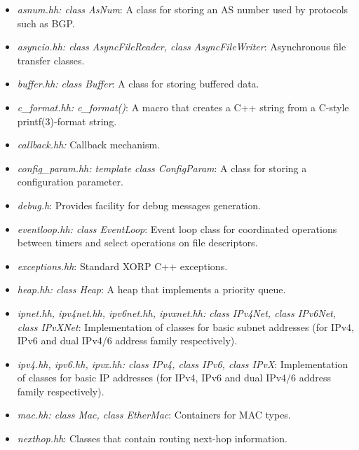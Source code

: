\documentclass[11pt]{article}
\begin{document}
\begin{itemize}

  \item \emph{asnum.hh: class AsNum}: A class for storing an AS number
  used by protocols such as BGP.

  \item \emph{asyncio.hh: class AsyncFileReader, class AsyncFileWriter}:
  Asynchronous file transfer classes.

  \item \emph{buffer.hh: class Buffer}:  A class for storing buffered
  data.

  \item \emph{c\_format.hh: c\_format()}: A macro that creates a C++ string
  from a C-style printf(3)-format string.

  \item \emph{callback.hh:} Callback mechanism.

  \item \emph{config\_param.hh: template class ConfigParam}: A class for
  storing a configuration parameter.

  \item \emph{debug.h}: Provides facility for debug messages generation.

  \item \emph{eventloop.hh: class EventLoop}: Event loop class for
  coordinated operations between timers and select operations on file
  descriptors.

  \item \emph{exceptions.hh}: Standard XORP C++ exceptions.

  \item \emph{heap.hh: class Heap}: A heap that implements a priority
  queue.

  \item \emph{ipnet.hh, ipv4net.hh, ipv6net.hh, ipvxnet.hh: class
  IPv4Net, class IPv6Net, class IPvXNet}: Implementation of classes for
  basic subnet addresses (for IPv4, IPv6 and dual IPv4/6 address family
  respectively).

  \item \emph{ipv4.hh, ipv6.hh, ipvx.hh: class
  IPv4, class IPv6, class IPvX}: Implementation of classes for
  basic IP addresses (for IPv4, IPv6 and dual IPv4/6 address family
  respectively).

  \item \emph{mac.hh: class Mac, class EtherMac}: Containers for
  MAC types.

  \item \emph{nexthop.hh}: Classes that contain routing next-hop
  information.


\end{itemize}
\end{document}
